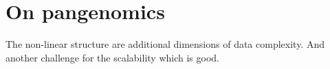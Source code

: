 \section{On pangenomics}

The non-linear structure are additional dimensions of data complexity. And
another challenge for the scalability which is good.